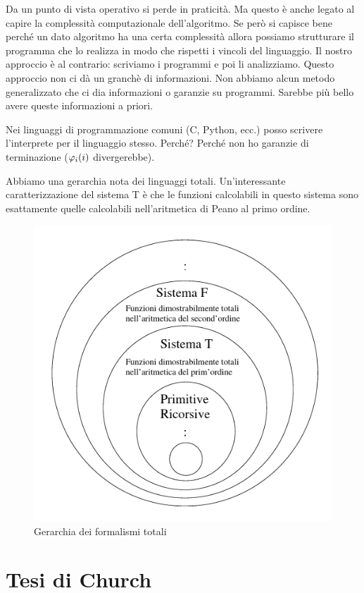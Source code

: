 Da un punto di vista operativo si perde in praticità. Ma questo è anche legato al capire la
complessità computazionale dell'algoritmo. Se però si capisce bene perché un dato algoritmo ha
una certa complessità allora possiamo strutturare il programma che lo realizza in modo che rispetti
i vincoli del linguaggio. Il nostro approccio è al contrario: scriviamo i programmi e poi li
analizziamo. Questo approccio non ci dà un granchè di informazioni. Non abbiamo alcun metodo
generalizzato che ci dia informazioni o garanzie su programmi. Sarebbe più bello avere queste
informazioni a priori.

Nei linguaggi di programmazione comuni (C, Python, ecc.) posso scrivere l'interprete per il
linguaggio stesso. Perché? Perché non ho garanzie di terminazione ($\varphi_{i}(i)$ divergerebbe).

Abbiamo una gerarchia nota dei linguaggi totali. Un'interessante caratterizzazione del sistema T è
che le funzioni calcolabili in questo sistema sono esattamente quelle calcolabili nell'aritmetica di
Peano al primo ordine.

\begin{figure}[h]
    \centering
    \includegraphics[scale=0.5]{img/TotalHierarchy.jpg}
    \caption{Gerarchia dei formalismi totali}
\end{figure}

\section{Tesi di Church}

